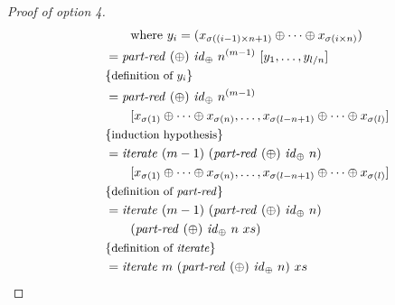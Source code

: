 \begin{proof}[Proof of option 4]
\begin{align*}
    &\qquad\qquad \text{where}\ y_i = (x_{\sigma((i-1)\times n + 1)} \oplus \dots \oplus x_{\sigma(i\times n)})\\
    &\qquad = \partRed\ (\oplus)\ \id_\oplus\ n^{(m-1)}\ [y_1, \ldots, y_{l/n}]\\
    &\qquad \comment{definition of $y_i$}\\
    &\qquad = \partRed\ (\oplus)\ \id_\oplus\ n^{(m-1)}\\
    &\qquad\qquad [x_{\sigma(1)} \oplus \dots \oplus x_{\sigma(n)}, \ldots, x_{\sigma(l-n+1)} \oplus \dots \oplus x_{\sigma(l)}]\\
    &\qquad \comment{induction hypothesis}\\
    &\qquad = \iterateN\ (m-1)\ (\partRed\ (\oplus)\ \id_\oplus\ n)\\
    &\qquad\qquad [x_{\sigma(1)} \oplus \dots \oplus x_{\sigma(n)}, \ldots, x_{\sigma(l-n+1)} \oplus \dots \oplus x_{\sigma(l)}]\\
    &\qquad \comment{definition of \partRed}\\
    &\qquad = \iterateN\ (m-1)\ (\partRed\ (\oplus)\ \id_\oplus\ n)\\
    &\qquad \qquad (\partRed\ (\oplus)\ \id_\oplus\ n\ xs)\\
    &\qquad \comment{definition of \iterateN}\\
    &\qquad = \iterateN\ m\ (\partRed\ (\oplus)\ \id_\oplus\ n)\ xs
  \end{align*}


\end{proof}
